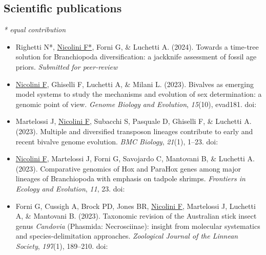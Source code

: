 \subsection*{Scientific publications}
\small{\textit{* equal contribution}}
\begin{itemize}
	\item Righetti N*, \underline{Nicolini F*}, Forni G, \& Luchetti A. (2024). Towards a time-tree solution for Branchiopoda diversification: a jackknife assessment of fossil age priors. \textit{Submitted for peer-review}
	\item \underline{Nicolini F}, Ghiselli F, Luchetti A, \& Milani L. (2023). Bivalves as emerging model systems to study the mechanisms and evolution of sex determination: a genomic point of view. \textit{Genome Biology and Evolution}, \textit{15}(10), evad181. doi: 
	\item Martelossi J, \underline{Nicolini F}, Subacchi S, Pasquale D, Ghiselli F, \& Luchetti A. (2023). Multiple and diversified transposon lineages contribute to early and recent bivalve genome evolution. \textit{BMC Biology}, \textit{21}(1), 1--23. doi: 
	\item \underline{Nicolini F}, Martelossi J, Forni G, Savojardo C, Mantovani B, \& Luchetti A. (2023). Comparative genomics of Hox and ParaHox genes among major lineages of Branchiopoda with emphasis on tadpole shrimps. \textit{Frontiers in Ecology and Evolution}, \textit{11}, 23. doi: 
	\item Forni G, Cussigh A, Brock PD, Jones BR, \underline{Nicolini F}, Martelossi J, Luchetti A, \& Mantovani B. (2023). Taxonomic revision of the Australian stick insect genus \textit{Candovia} (Phasmida: Necrosciinae): insight from molecular systematics and species-delimitation approaches. \textit{Zoological Journal of the Linnean Society}, \textit{197}(1), 189--210. doi: 
\end{itemize}